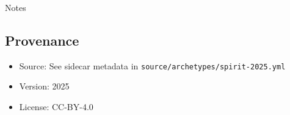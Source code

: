 \documentclass[11pt]{article}
\def\tightlist{}
\begin{document}
\begin{Form}
{Notes}

\subsection{Provenance}\label{provenance}

\begin{itemize}
\tightlist
\item
  Source: See sidecar metadata in
  \texttt{source/archetypes/spirit-2025.yml}
\item
  Version: 2025
\item
  License: CC-BY-4.0
\end{itemize}

\end{Form}
\end{document}
